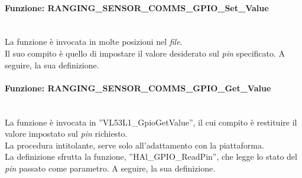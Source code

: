 \paragraph{Funzione: RANGING\_SENSOR\_COMMS\_GPIO\_Set\_Value}\mbox{}\\
La funzione è invocata in molte posizioni nel \textit{file}.\\
Il suo compito è quello di impostare il valore desiderato sul \textit{pin} specificato. A seguire, la sua definizione.\\


\paragraph{Funzione: RANGING\_SENSOR\_COMMS\_GPIO\_Get\_Value}\mbox{}\\
La funzione è invocata in ''VL53L1\_GpioGetValue'', il cui compito è restituire il valore impostato sul \textit{pin} richiesto.\\
La procedura intitolante, serve solo all'adattamento con la piattaforma.\\
La definizione sfrutta la funzione, ''HAl\_GPIO\_ReadPin'', che legge lo stato del \textit{pin} passato come parametro. A seguire, la sua definizione.\\


